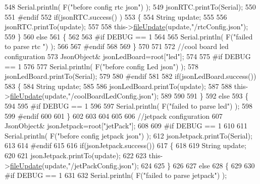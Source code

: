 \begin{DoxyCode}
548     Serial.println( F(\textcolor{stringliteral}{"before config rtc json"}) );
549     jsonRTC.printTo(Serial);
550 
551 \textcolor{preprocessor}{#endif}
552     \textcolor{keywordflow}{if}(jsonRTC.success() )
553     \{
554         String update;
555 
556         jsonRTC.printTo(update);
557 
558         this->\hyperlink{class_cool_file_system_a13f2958f5b87757c31fc53797a30d23a}{fileUpdate}(update,\textcolor{stringliteral}{"/rtcConfig.json"});           
559     \}
560     \textcolor{keywordflow}{else}
561     \{
562     
563 \textcolor{preprocessor}{    #if DEBUG == 1 }
564 
565         Serial.println( F(\textcolor{stringliteral}{"failed to parse rtc "}) );
566     
567 \textcolor{preprocessor}{    #endif}
568 
569     \}
570     
571     
572         \textcolor{comment}{//cool board led configuration}
573         JsonObject& jsonLedBoard=root[\textcolor{stringliteral}{"led"}];
574     
575 \textcolor{preprocessor}{#if DEBUG == 1 }
576 
577     Serial.println( F(\textcolor{stringliteral}{"before config Led json"}) );
578     jsonLedBoard.printTo(Serial);
579 
580 \textcolor{preprocessor}{#endif}
581 
582     \textcolor{keywordflow}{if}(jsonLedBoard.success())
583     \{   
584         String update;
585     
586         jsonLedBoard.printTo(update);
587 
588         this->\hyperlink{class_cool_file_system_a13f2958f5b87757c31fc53797a30d23a}{fileUpdate}(update,\textcolor{stringliteral}{"/coolBoardLedConfig.json"});      
589 
590     
591     \}
592     \textcolor{keywordflow}{else}
593     \{
594     
595 \textcolor{preprocessor}{    #if DEBUG == 1 }
596 
597         Serial.println( F(\textcolor{stringliteral}{"failed to parse led"}) );
598     
599 \textcolor{preprocessor}{    #endif }
600 
601     \}
602         
603 
604     
605 
606     \textcolor{comment}{//jetpack configuration}
607         JsonObject& jsonJetpack=root[\textcolor{stringliteral}{"jetPack"}];
608 
609 \textcolor{preprocessor}{#if DEBUG == 1 }
610 
611     Serial.println( F(\textcolor{stringliteral}{"before config jetpack json"}) );
612     jsonJetpack.printTo(Serial);
613 
614 \textcolor{preprocessor}{#endif}
615 
616     \textcolor{keywordflow}{if}(jsonJetpack.success())
617     \{
618     
619         String update;
620     
621         jsonJetpack.printTo(update);
622 
623         this->\hyperlink{class_cool_file_system_a13f2958f5b87757c31fc53797a30d23a}{fileUpdate}(update,\textcolor{stringliteral}{"/jetPackConfig.json"});       
624 
625     \}
626 
627     \textcolor{keywordflow}{else}
628     \{
629     
630 \textcolor{preprocessor}{    #if DEBUG == 1 }
631 
632         Serial.println( F(\textcolor{stringliteral}{"failed to parse jetpack"}) ); 

\end{DoxyCode}
